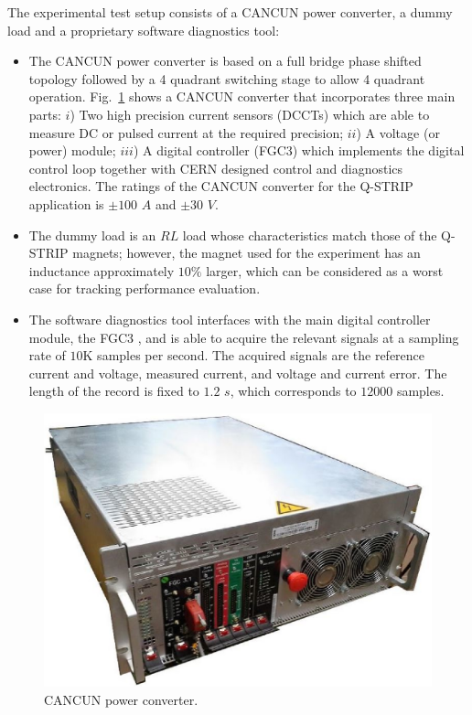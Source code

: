 \documentclass[journal]{IEEEtran}
\begin{document}
The experimental test setup consists of a CANCUN power converter, a dummy load and a proprietary software diagnostics tool:

\begin{itemize}
	\item The CANCUN power converter is based on a full bridge phase shifted topology followed by a 4 quadrant switching stage to allow 4 quadrant operation. Fig.~\ref{fig:cancun} shows a CANCUN converter that incorporates three main parts: $i$) Two high precision current sensors (DCCTs) which are able to measure DC or pulsed current at the required precision; $ii$) A voltage (or power) module; $iii$) A digital controller (FGC3) which implements the digital control loop together with CERN designed control and diagnostics electronics. The ratings of the CANCUN converter for the Q-STRIP application is $\pm 100$ $A$ and $\pm 30$ $V$.
	\item The dummy load is an $RL$ load whose characteristics match those of the Q-STRIP magnets; however, the magnet used for the experiment has an inductance approximately $10\%$ larger, which can be considered as a worst case for tracking performance evaluation.
	\item The software diagnostics tool interfaces with the main digital controller module, the FGC3 \cite{CKS11}, and is able to acquire the relevant signals at a sampling rate of $10$K samples per second. The acquired signals are the reference current and voltage, measured current, and voltage and current error. The length of the record is fixed to $1.2$ $s$, which corresponds to $12000$ samples.
\end{itemize}

\begin{figure}
\centering
\includegraphics[width=0.8\columnwidth]{pics/housing_rack.eps}
\caption{CANCUN power converter. } 
\label{fig:cancun}
\end{figure}
\end{document}
